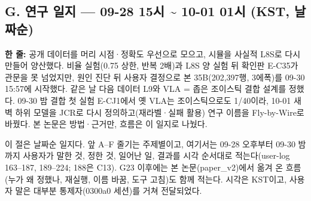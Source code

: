 \subsection{G. 연구 일지 --- 09-28 15시 \textasciitilde{} 10-01 01시 (KST, 날짜순)}\label{rec:G}
\noindent\textbf{한 줄:} 공개 데이터를 머리 시점·정확도 우선으로 모으고, 시뮬을 사실적 L8S로 다시 만들어 양산했다. 비율 실험(0.75 상한, 반복 2배)과 L8S 양 실험 뒤 확인판 E-C35가 관문을 못 넘었지만, 원인 진단 뒤 사용자 결정으로 본 35B(202,397행, 3에폭)를 09-30 15:57에 시작했다. 같은 날 다음 데이터 L9와 VLA = 좁은 조이스틱 결합 설계를 정했다. 09-30 밤 결합 첫 실험 E-CJ1에서 옛 VLA는 조이스틱으로도 1/40이라, 10-01 새벽 하위 모델을 JCR로 다시 정의하고(재라벨·실패 활용) 연구 이름을 Fly-by-Wire로 바꿨다. 본 논문은 방법·근거만, 흐름은 이 일지로 나눴다.

이 절은 날짜순 일지다. 앞 A--F 줄기는 주제별이고, 여기서는 09-28 오후부터 09-30 밤까지 사용자가 말한 것, 정한 것, 일어난 일, 결과를 시각 순서대로 적는다(user-log 163--187, 189--224; 188은 C13). G23 이후에는 본 논문(paper\_v2)에서 옮겨 온 흐름(누가 왜 정했나, 재실행, 이름 바꿈, 도구 고침)도 함께 적는다. 시각은 KST이고, 사용자 말은 대부분 통제자(0300a0 세션)를 거쳐 전달되었다.

